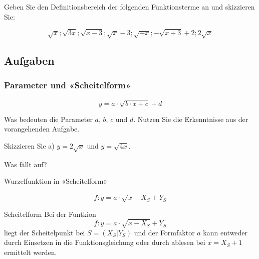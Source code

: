 Geben Sie den Definitionsbereich der folgenden Funktionsterme an und skizzieren Sie:

$$\sqrt{x}; \sqrt{3x}; \sqrt{x-3}; \sqrt{x} - 3;
\sqrt{-x}; -\sqrt{x+3} + 2; 2\sqrt{x}$$

\subsection*{Aufgaben}


\newpage


\subsubsection{Parameter und «Scheitelform»}
$$y = a\cdot{} \sqrt{b\cdot{}x + c} + d$$

Was bedeuten die Parameter $a$, $b$, $c$ und $d$. Nutzen Sie die
Erkenntnisse aus der vorangehenden Aufgabe.


Skizzieren Sie a) $y=2\sqrt{x}$ und $y=\sqrt{4x}$.

Was fällt auf?



\begin{definition}{Wurzelfunktion in «Scheitelform»}{}

  $$f: y = a\cdot{}\sqrt{x-X_S} + Y_S$$

\end{definition}

\begin{gesetz}{Scheitelform}{}
  Bei der Funtkion
  $$f: y = a\cdot{}\sqrt{x-X_S} + Y_S$$
liegt der Scheitelpunkt bei $S=(X_S | Y_S)$ und der Formfaktor $a$ kann
entweder durch Einsetzen in die Funktionsgleichung oder durch ablesen
bei $x=X_S+1$ ermittelt werden.
\end{gesetz}

